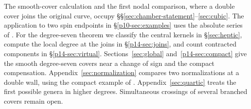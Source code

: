 The smooth-cover calculation and the first nodal comparison, where
a double cover joins the original curve, occupy
\S\S\ref{sec:chamber-statement}--\ref{sec:cubic}. The application to two spin endpoints in \S\ref{p10-sec:examples}
uses the absolute series of \cite[Theorem~1.1]{WueSpin}. For the
degree-seven theorem we classify the central kernels in
\S\ref{sec:heptic}, compute the local degree at the joins in
\S\ref{p14-sec:joins}, and count contracted components in
\S\ref{p14-sec:virtual}. Sections~\ref{sec:global}
and~\ref{p14-sec:compact} give the smooth degree-seven covers near a
change of sign and the compact compensation. Appendix~\ref{sec:normalization}
compares two normalizations at a double wall, using the compact
example of \cite{WueCounter}. Appendix~\ref{sec:quartic} treats the
first possible genera in higher degrees. Simultaneous crossings of
several branched covers remain open.
